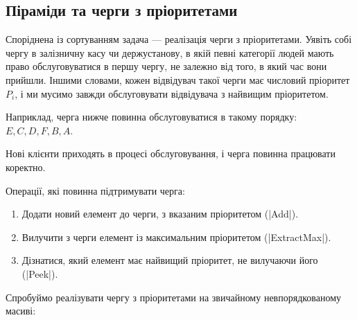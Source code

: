 \documentclass[12pt,a4paper]{report}
\begin{document}
\subsection{Піраміди та черги з пріоритетами}

Споріднена із сортуванням задача --- реалізація черги з пріоритетами. Уявіть собі чергу в залізничну касу чи держустанову, в якій певні категорії людей мають право обслуговуватися в першу чергу, не залежно від того, в який час вони прийшли. Іншими словами, кожен відвідувач такої черги має числовий пріоритет \(P_i\), і ми мусимо завжди обслуговувати відвідувача з найвищим пріоритетом.

Наприклад, черга нижче повинна обслуговуватися в такому порядку: \(E, C, D, F, B, A\).

\begin{center}
    \footnotesize
\end{center}

Нові клієнти приходять в процесі обслуговування, і черга повинна працювати коректно.

Операції, які повинна підтримувати черга:

\begin{enumerate}
    \item Додати новий елемент до черги, з вказаним пріоритетом (|Add|).
    \item Вилучити з черги елемент із максимальним пріоритетом (|ExtractMax|).
    \item Дізнатися, який елемент має найвищий пріоритет, не вилучаючи його (|Peek|).
\end{enumerate}

Спробуймо реалізувати чергу з пріоритетами на звичайному невпорядкованому масиві:
\end{document}
